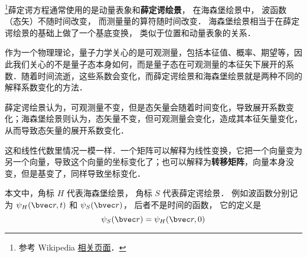 



\footnote{参考 Wikipedia \href{https://en.wikipedia.org/wiki/Heisenberg_picture}{相关页面}．}薛定谔方程通常使用的是动量表象和\textbf{薛定谔绘景}， 在海森堡绘景中， 波函数（态矢）不随时间改变， 而测量量的算符随时间改变． 海森堡绘景相当于在薛定谔绘景的基础上做了一个基底变换， 类似于位置和动量表象的关系．



作为一个物理理论，量子力学关心的是可观测量，包括本征值、概率、期望等，因此我们关心的不是量子态本身如何，而是量子态在可观测量的本征矢下展开的系数．随着时间流逝，这些系数会变化，而薛定谔绘景和海森堡绘景就是两种不同的解释系数变化的方法．

薛定谔绘景认为，可观测量不变，但是态矢量会随着时间变化，导致展开系数变化；海森堡绘景则认为，态矢量不变，但可观测量会变化，造成其本征矢量变化，从而导致态矢量的展开系数变化．

这和线性代数里情况一模一样．一个矩阵可以解释为线性变换，它把一个向量变为另一个向量，导致这个向量的坐标变化了；也可以解释为\textbf{转移矩阵}，向量本身没变，但是基变了，同样导致坐标变化．



本文中，角标 $H$ 代表海森堡绘景， 角标 $S$ 代表薛定谔绘景． 例如波函数分别记为 $\psi_H(\bvec r, t)$ 和 $\psi_S(\bvec r)$， 后者不是时间的函数， 它的定义是
\begin{equation}
\psi_S(\bvec r) = \psi_H(\bvec r, 0)
\end{equation}



